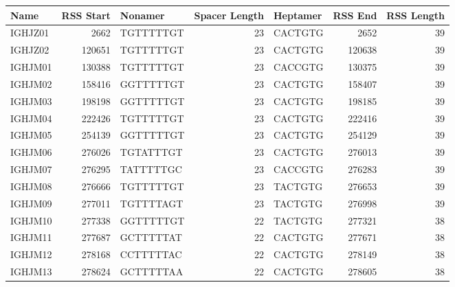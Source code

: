 \begin{tabular}{lrlrlrr}
  \toprule Name & RSS Start & Nonamer & Spacer Length & Heptamer & RSS End & RSS Length \\ 
  \midrule IGHJZ01 & 2662 & TGTTTTTGT & 23 & CACTGTG & 2652 & 39 \\ 
  IGHJZ02 & 120651 & TGTTTTTGT & 23 & CACTGTG & 120638 & 39 \\ 
  IGHJM01 & 130388 & TGTTTTTGT & 23 & CACCGTG & 130375 & 39 \\ 
  IGHJM02 & 158416 & GGTTTTTGT & 23 & CACTGTG & 158407 & 39 \\ 
  IGHJM03 & 198198 & GGTTTTTGT & 23 & CACTGTG & 198185 & 39 \\ 
  IGHJM04 & 222426 & TGTTTTTGT & 23 & CACTGTG & 222416 & 39 \\ 
  IGHJM05 & 254139 & GGTTTTTGT & 23 & CACTGTG & 254129 & 39 \\ 
  IGHJM06 & 276026 & TGTATTTGT & 23 & CACTGTG & 276013 & 39 \\ 
  IGHJM07 & 276295 & TATTTTTGC & 23 & CACCGTG & 276283 & 39 \\ 
  IGHJM08 & 276666 & TGTTTTTGT & 23 & TACTGTG & 276653 & 39 \\ 
  IGHJM09 & 277011 & TGTTTTAGT & 23 & TACTGTG & 276998 & 39 \\ 
  IGHJM10 & 277338 & GGTTTTTGT & 22 & TACTGTG & 277321 & 38 \\ 
  IGHJM11 & 277687 & GCTTTTTAT & 22 & CACTGTG & 277671 & 38 \\ 
  IGHJM12 & 278168 & CCTTTTTAC & 22 & CACTGTG & 278149 & 38 \\ 
  IGHJM13 & 278624 & GCTTTTTAA & 22 & CACTGTG & 278605 & 38 \\ 
   \bottomrule \end{tabular}
